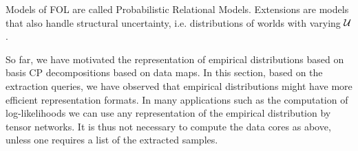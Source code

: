 %
%
%
%
%









Models of FOL are called Probabilistic Relational Models. %
Extensions are models that also handle structural uncertainty, i.e. distributions of worlds with varying $\mathcal{U}$.




%
\begin{remark}
    So far, we have motivated the representation of empirical distributions based on basis CP decompositions based on data maps.
    In this section, based on the extraction queries, we have observed that empirical distributions might have more efficient representation formats.
    In many applications such as the computation of log-likelihoods we can use any representation of the empirical distribution by tensor networks.
    It is thus not necessary to compute the data cores as above, unless one requires a list of the extracted samples.
\end{remark}